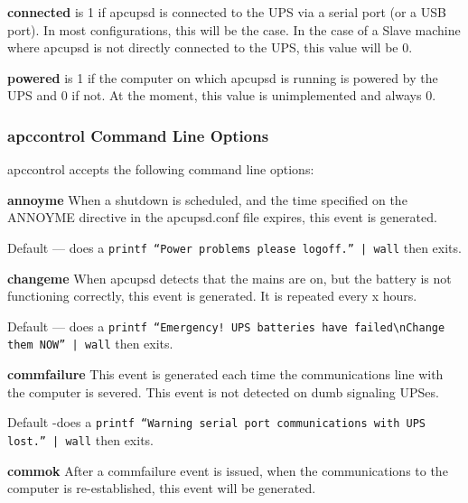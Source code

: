 {{{{{{{{{\begin{description}
\item {\bf connected}
is 1 if apcupsd is connected to the UPS via a serial port (or a USB port). In
most configurations, this will be the case. In the case of a Slave machine
where apcupsd is not directly connected to the UPS, this value will be 0.  

\item {\bf powered}
is 1 if the computer on which apcupsd is running is powered by the UPS and 0
if not.  At the moment, this value is unimplemented and always 0. 
\end{description}

\label{apccontrol-Command-Line-Options}

\subsubsection*{apccontrol Command Line Options}

apccontrol accepts the following command line options:  

\begin{description}

\item {\bf annoyme}
When a shutdown is scheduled, and the time specified on the ANNOYME directive
in the apcupsd.conf file expires, this event is generated.  

Default {---} does a {\tt printf ``Power problems please logoff.'' | wall}
then exits.  

\item {\bf changeme}
When apcupsd detects that the mains are on, but the battery is not functioning
correctly, this event is generated. It is repeated every x hours.  

Default {---} does a {\tt printf ``Emergency! UPS batteries have
failed\textbackslash{}nChange them NOW'' | wall} then exits.  

\item {\bf commfailure}
This event is generated each time the communications line with the computer is
severed. This event is not detected on dumb signaling UPSes.  

Default -does a {\tt printf ``Warning serial port communications with UPS
lost.'' | wall} then exits.  

\item {\bf commok}
After a commfailure event is issued, when the communications to the computer
is re-established, this event will be generated.  


\end{description}}}}}}}}}}

